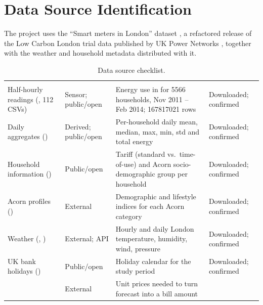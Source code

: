 \documentclass{smartmeter-report}   %
\begin{document}
\section{Data Source Identification}
The project uses the \enquote{Smart meters in London} dataset \parencite{kaggle_smartmeters},
a refactored release of the Low Carbon London trial data published by UK Power Networks
\parencite{ukpn_lcl}, together with the weather and household metadata distributed with it.

\begin{table}[H]
\centering\small
\smrows
\begin{tabularx}{\linewidth}{L{3.6cm} L{2.2cm} Y L{2.6cm}}
\headrow {} &  &  &  \\
Half-hourly readings (, 112 CSVs)
  & Sensor; public/open
  & Energy use in \kwhhh{} for \num{5566} households, Nov 2011 -- Feb 2014; \num{167817021} rows
  & Downloaded; confirmed \\
Daily aggregates ()
  & Derived; public/open
  & Per-household daily mean, median, max, min, std and total energy
  & Downloaded; confirmed \\
Household information ()
  & Public/open
  & Tariff (standard vs.\ time-of-use) and Acorn socio-demographic group per household
  & Downloaded; confirmed \\
Acorn profiles ()
  & External
  & Demographic and lifestyle indices for each Acorn category \parencite{caci_acorn}
  & Downloaded; confirmed \\
Weather (, )
  & External; API
  & Hourly and daily London temperature, humidity, wind, pressure \parencite{darksky}
  & Downloaded; confirmed \\
UK bank holidays ()
  & Public/open
  & Holiday calendar for the study period
  & Downloaded; confirmed \\
  & External
  & Unit prices needed to turn forecast \kwh{} into a bill amount
  &  \\
\end{tabularx}
\caption{Data source checklist.}
\label{tab:sources}
\end{table}
\end{document}
